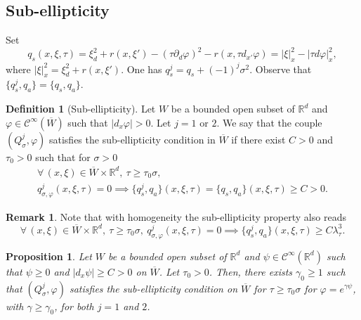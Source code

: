 \documentclass[JEP,XML,SOM,Unicode,published]{cedram}
\theoremstyle{plain}
\newtheorem{proposition}[theorem]{Proposition}
\theoremstyle{definition}
\newtheorem{definition}[theorem]{Definition}
\newtheorem{remark}[theorem]{Remark}
\def\R{\mathbb{R}}
\let\csp\gamma
\newcommand{\ovl}[1]{\overline{#1}}
\newcommand{\lsc}{\lambda_\tau}
\newcommand{\Qsig}{Q_{\sigma}}
\newcommand{\qconj}{q_{\sigma,\varphi}}
\newcommand{\qs}{q_{s}}
\newcommand{\qa}{q_{a}}
\newcommand{\Con}{\ensuremath{\mathscr C}}
\newcommand{\Cinf}{\ensuremath{\Con^\infty}}
\begin{document}
\subsection{Sub-ellipticity}
Set
\begin{equation*}
\qs(x,\xi,\tau)
=\xi_d^2+r(x,\xi')-(\tau\partial_d\varphi)^2
-r(x,\tau d_{x'}\varphi)
=|\xi|^2_x-|\tau d\varphi|_x^2,
\end{equation*}
where $|\xi|^2_x=\xi_d^2+r(x,\xi')$. One has $\qs^j= \qs + (-1)^j
\sigma^2$.
Observe that $\{\qs^j,\qa\}=\{\qs, \qa\}$.

\begin{definition}[Sub-ellipticity]\label{de1}
Let $W$ be a bounded open subset of $\R^d$ and
$\varphi\in \Cinf(\ovl{W})$ such that
$|d_x\varphi|>0$. Let $j =1$ or $2$. We say that the couple
$(\Qsig^j,\varphi)$ satisfies the sub-ellipticity condition
in $\ovl{W}$ if there exist $C>0$ and $\tau_0>0$ such that for
$\sigma>0$
\begin{multline*}
\forall\,(x,\xi)\in\ovl{W}\times\R^d,~\tau\geq
\tau_0\sigma,\\
\qconj^j(x,\xi,\tau)=0\implies
\{\qs^j,\qa\}(x,\xi,\tau) = \{\qs,\qa\}(x,\xi,\tau)\geq C>0.
\end{multline*}
\end{definition}

\begin{remark}
Note that with homogeneity the sub-ellipticity property also reads
\begin{equation*}
\forall\,(x,\xi)\in\ovl{W}\times\R^d,~\tau\geq
\tau_0\sigma,~\qconj^j(x,\xi,\tau)=0\implies
\{\qs^j,\qa\}(x,\xi,\tau)\geq C \lsc^3.
\end{equation*}
\end{remark}

\begin{proposition}
\label{prop: sub-ellipticity recipe}
Let $W$ be a bounded open subset of $\R^d$ and
$\psi\in\Cinf(\R^d)$ such that $\psi\geq 0$ and
$|d_x\psi|\geq C>0$ on $\ovl{W}$. Let $\tau_0>0$. Then, there exists
$\csp_0\geq 1$ such that $(\Qsig^j,\varphi)$
satisfies the sub-ellipticity condition
on $\ovl{W}$ for $\tau\geq\tau_0 \sigma$ for
$\varphi=e^{\csp\psi}$, with $\csp\geq \csp_0$, for both
$j=1$ and $2$.
\end{proposition}
\end{document}
